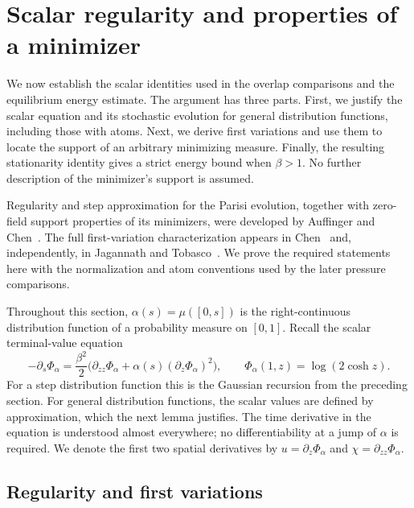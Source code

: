 \section{Scalar regularity and properties of a minimizer}\label{static-sec:scalar}

We now establish the scalar identities used in the overlap comparisons
and the equilibrium energy estimate. The argument has three parts.
First, we justify the scalar equation and its stochastic evolution for
general distribution functions, including those with atoms. Next, we
derive first variations and use them to locate the support of an
arbitrary minimizing measure. Finally, the resulting stationarity
identity gives a strict energy bound when $\beta>1$. No further
description of the minimizer's support is assumed.

Regularity and step approximation for the Parisi evolution, together
with zero-field support properties of its minimizers, were developed
by Auffinger and Chen~\cite[Propositions~1--2 and Theorems~1, 5]{AC2015}.
The full first-variation characterization
appears in Chen~\cite[Theorem~2 and Proposition~1]{Chen2017} and,
independently, in Jagannath and Tobasco~\cite[Proposition~1.1,
Corollary~3.10 and Remark~1.3]{JT2017}. We prove the required statements
here with the normalization and atom conventions used by the later
pressure comparisons.

Throughout this section, $\alpha(s)=\mu([0,s])$ is the right-continuous
distribution function of a probability measure on $[0,1]$. Recall the
scalar terminal-value equation
\begin{equation}\label{static-eq:scalar-pde-recalled}
 -\partial_s\Phi_\alpha
 =\frac{\beta^2}{2}\bigl(\partial_{zz}\Phi_\alpha
          +\alpha(s)(\partial_z\Phi_\alpha)^2\bigr),
 \qquad \Phi_\alpha(1,z)=\log(2\cosh z).
\end{equation}
For a step distribution function this is the Gaussian recursion from
the preceding section. For general distribution functions, the scalar
values are defined by approximation, which the next lemma justifies.
The time derivative in the equation is understood almost everywhere;
no differentiability at a jump of $\alpha$ is required.
We denote the first two spatial derivatives by $u=\partial_z\Phi_\alpha$ and
$\chi=\partial_{zz}\Phi_\alpha$.

\subsection{Regularity and first variations}

